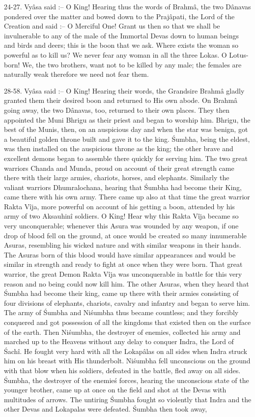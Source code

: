 24-27. Vy\^asa said :-- O King! Hearing thus the words of Brahm\^a, the two D\^anavas pondered over the matter and bowed down to the Praj\^apati, the Lord of the Creation and said :-- O Merciful One! Grant us then so that we shall be invulnerable to any of the male of the Immortal Devas down to human beings and birds and deers; this is the boon that we ask. Where exists the woman so powerful as to kill us? We never fear any woman in all the three Lokas. O Lotus-born! We, the two brothers, want not to be killed by any male; the females are naturally weak therefore we need not fear them.

28-58. Vy\^asa said :-- O King! Hearing their words, the Grandsire Brahm\^a gladly granted them their desired boon and returned to His own abode. On Brahm\^a going away, the two D\^anavas, too, returned to their own places. They then appointed the Muni Bhrigu as their priest and began to worship him. Bhrigu, the best of the Munis, then, on an auspicious day and when the star was benign, got a beautiful golden throne built and gave it to the king. \'Sumbha, being the eldest, was then installed on the auspicious throne as the king; the other brave and excellent demons began to assemble there quickly for serving him. The two great warriors Chanda and Munda, proud on account of their great strength came there with their large armies, chariots, horses, and elephants. Similarly the valiant warriors Dhumralochana, hearing that \'Sumbha had become their King, came there with his own army. There came up also at that time the great warrior Rakta V\^ija, more powerful on account of his getting a boon, attended by his army of two Aksauhin\^i soldiers. O King! Hear why this Rakta V\^ija became so very unconquerable; whenever this Asura was wounded by any weapon, if one drop of blood fell on the ground, at once would be created so many innumerable Asuras, resembling his wicked nature and with similar weapons in their hands. The Asuras born of this blood would have similar appearances and would be similar in strength and ready to fight at once when they were born. That great warrior, the great Demon Rakta V\^ija was unconquerable in battle for this very reason and no being could now kill him. The other Asuras, when they heard that \'Sumbha had become their king, came up there with their armies consisting of four divisions of elephants, chariots, cavalry and infantry and began to serve him. The army of \'Sumbha and Ni\'sumbha thus became countless; and they forcibly conquered and got possession of all the kingdoms that existed then on the surface of the earth. Then Ni\'sumbha, the destroyer of enemies, collected his army and marched up to the Heavens without any delay to conquer Indra, the Lord of \'Sach\^i. He fought very hard with all the Lokap\^alas on all sides when Indra struck him on his breast with His thunderbolt. Ni\'sumbha fell unconscious on the ground with that blow when his soldiers, defeated in the battle, fled away on all sides. \'Sumbha, the destroyer of the enemie\'s forces, hearing the unconscious state of the younger brother, came up at once on the field and shot at the Devas with multitudes of arrows. The untiring \'Sumbha fought so violently that Indra and the other Devas and Lokapalas were defeated. \'Sumbha then took away, 